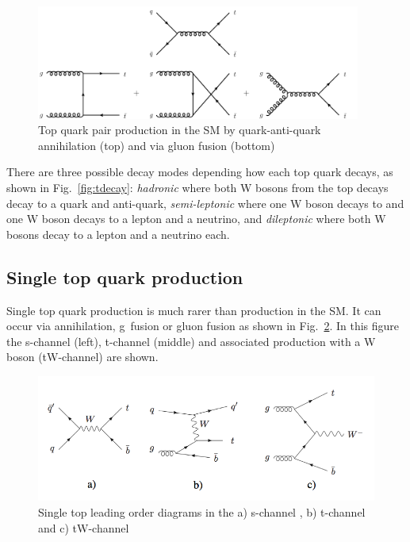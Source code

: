 \begin{figure}[ht!]
\begin{center}
    \includegraphics[width=0.95\textwidth]{images/Theory/ttbarfeynman.png}
    \caption{Top quark pair production in the SM by quark-anti-quark annihilation (top) and via gluon fusion (bottom)~\cite{Kohn:2012ksa}}
    \label{fig:ttproduction}
\end{center}
\end{figure}

There are three possible decay modes depending how each top quark decays, as shown in Fig.~\ref{fig:tdecay}: \emph{hadronic} where both W bosons from the top decays decay to a quark and anti-quark, \emph{semi-leptonic} where one W boson decays to \qqbar and one W boson decays to a lepton and a neutrino, and \emph{dileptonic} where both W bosons decay to a lepton and a neutrino each.


\subsection{Single top quark production}

Single top quark production is much rarer than \ttbar production in the SM. It can occur via \qqbar annihilation, g\cPq~fusion or gluon fusion as shown in Fig.~\ref{fig:stFeyn}. In this figure the s-channel (left), t-channel (middle) and associated production with a W boson (tW-channel) are shown.

\begin{figure}[ht!]
\begin{center}
    \includegraphics[width=\textwidth]{images/Theory/stFeyn.png}
    \caption{Single top leading order diagrams in the a) s-channel , b) t-channel and c) tW-channel~\cite{Lannon:2012fp}}
    \label{fig:stFeyn}
\end{center}
\end{figure}

